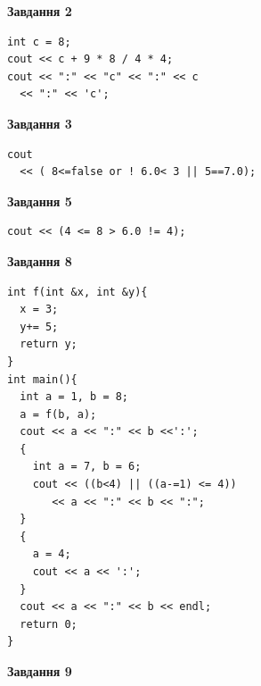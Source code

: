 \documentclass[12pt, ukrainian]{article}
\begin{document}
{\begin {large}
\begin{minipage}[t]{7.0cm}
\end{minipage}
\vline \hspace{1mm}
\begin{minipage}[t]{11.0cm}

\begin{center}
\textbf{Завдання 2}
\end{center}
\vspace{-8mm}

\begin{verbatim}
int c = 8;
cout << c + 9 * 8 / 4 * 4;
cout << ":" << "c" << ":" << c 
  << ":" << 'c';
\end{verbatim}



\begin{center}
\textbf{Завдання 3}
\end{center}
\vspace{-8mm}

\begin{verbatim}
cout 
  << ( 8<=false or ! 6.0< 3 || 5==7.0);
\end{verbatim}



\begin{center}
\textbf{Завдання 5}
\end{center}
\vspace{-8mm}

\begin{verbatim}
cout << (4 <= 8 > 6.0 != 4);
\end{verbatim}



\begin{center}
\textbf{Завдання 8}
\end{center}
\vspace{-8mm}

\begin{verbatim}
int f(int &x, int &y){
  x = 3;
  y+= 5;
  return y;
}
int main(){
  int a = 1, b = 8;
  a = f(b, a);
  cout << a << ":" << b <<':';
  {
    int a = 7, b = 6;
    cout << ((b<4) || ((a-=1) <= 4))
       << a << ":" << b << ":";
  }
  {
    a = 4;
    cout << a << ':';
  }
  cout << a << ":" << b << endl;
  return 0;
}
\end{verbatim}

\end{minipage}


\begin{minipage}[t]{7.0cm}

\begin{center}
\textbf{Завдання 9}
\end{center}
\vspace{-8mm}


\end{minipage}
\end{large}}
\end{document}
